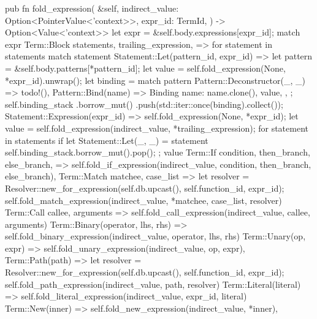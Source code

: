 \documentclass[
  oneside,
  english,
  coorientadorbanca,
  noabntexcite
]{ufsc-thesis-rn46-2019}
\begin{document}
\begin{rustcode}
{    pub fn fold_expression(
        &self,
        indirect_value: Option<PointerValue<'context>>,
        expr_id: TermId,
    ) -> Option<Value<'context>> {
        let expr = &self.body.expressions[expr_id];
        match expr {
            Term::Block {
                statements,
                trailing_expression,
            } => {
                for statement in statements {
                    match statement {
                        Statement::Let(pattern_id, expr_id) => {
                            let pattern = &self.body.patterns[*pattern_id];
                            let value = self.fold_expression(None, *expr_id).unwrap();
                            let binding = match pattern {
                                Pattern::Deconstructor(_, _) => todo!(),
                                Pattern::Bind(name) => Binding {
                                    name: name.clone(),
                                    value,
                                },
                            };
                            self.binding_stack
                                .borrow_mut()
                                .push(std::iter::once(binding).collect());
                        }
                        Statement::Expression(expr_id) => {
                            self.fold_expression(None, *expr_id);
                        }
                    }
                }
                let value = self.fold_expression(indirect_value, *trailing_expression);
                for statement in statements {
                    if let Statement::Let(_, _) = statement {
                        self.binding_stack.borrow_mut().pop();
                    };
                }
                value
            }
            Term::If {
                condition,
                then_branch,
                else_branch,
            } => self.fold_if_expression(indirect_value, condition, then_branch, else_branch),
            Term::Match { matchee, case_list } => {
                let resolver =
                    Resolver::new_for_expression(self.db.upcast(), self.function_id, expr_id);
                self.fold_match_expression(indirect_value, *matchee, case_list, resolver)
            }
            Term::Call { callee, arguments } => {
                self.fold_call_expression(indirect_value, callee, arguments)
            }
            Term::Binary(operator, lhs, rhs) => {
                self.fold_binary_expression(indirect_value, operator, lhs, rhs)
            }
            Term::Unary(op, expr) => self.fold_unary_expression(indirect_value, op, expr),
            Term::Path(path) => {
                let resolver =
                    Resolver::new_for_expression(self.db.upcast(), self.function_id, expr_id);
                self.fold_path_expression(indirect_value, path, resolver)
            }
            Term::Literal(literal) => {
                self.fold_literal_expression(indirect_value, expr_id, literal)
            }
            Term::New(inner) => self.fold_new_expression(indirect_value, *inner),
        }
    }

}
\end{rustcode}
\end{document}
